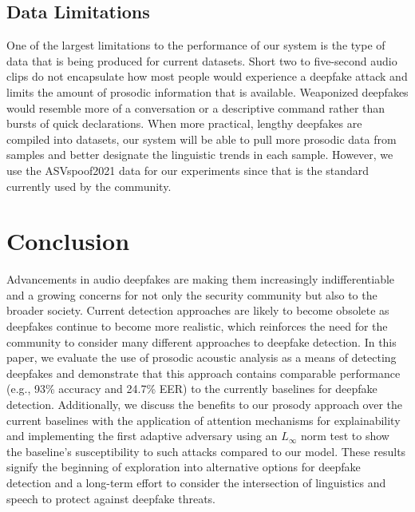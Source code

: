 \documentclass[10pt, journal, anonymous=true]{IEEEtran}
\begin{document}
\subsection{Data Limitations} \label{Dataset Limitations}

One of the largest limitations to the performance of our system is the type of data that is being produced for current datasets. Short two to five-second audio clips do not encapsulate how most people would experience a deepfake attack and limits the amount of prosodic information that is available. 
Weaponized deepfakes would resemble more of a conversation or a descriptive command rather than bursts of quick declarations. When more practical, lengthy deepfakes are compiled into datasets, our system will be able to pull more prosodic data from samples and better designate the linguistic trends in each sample. However, we use the ASVspoof2021 data for our experiments since that is the standard
currently used by the community.  

\section{Conclusion} \label{sec:conc} 
Advancements in audio deepfakes are making them increasingly indifferentiable and a growing concerns for not only the security community but also to the broader society. Current detection approaches are likely to become obsolete as deepfakes continue to become more realistic, which reinforces the need for the community to consider many different approaches to deepfake detection. In this paper, we evaluate the use of prosodic acoustic analysis as a means of detecting deepfakes and demonstrate that this approach contains comparable performance (e.g., 93\% accuracy and 24.7\% EER) to the currently baselines for deepfake detection. Additionally, we discuss the benefits to our prosody approach over the current baselines with the application of attention mechanisms for explainability and implementing the first adaptive adversary using an $L_\infty$ norm test to show the baseline's susceptibility to such attacks compared to our model. These results signify the beginning of exploration into alternative options for deepfake detection and a long-term effort to consider the intersection of linguistics and speech to protect against deepfake threats. 





\clearpage
\newpage

\appendix
\end{document}
